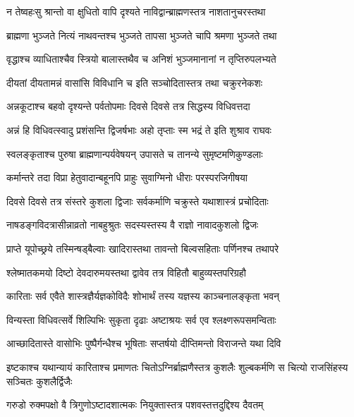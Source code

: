 \twolineshloka
{न तेष्वहःसु श्रान्तो वा क्षुधितो वापि दृश्यते}
{नाविद्वान्ब्राह्मणस्तत्र नाशतानुचरस्तथा} %

\twolineshloka
{ब्राह्मणा भुञ्जते नित्यं नाथवन्तश्च भुञ्जते}
{तापसा भुञ्जते चापि श्रमणा भुञ्जते तथा} %

\twolineshloka
{वृद्धाश्च व्याधिताश्चैव स्त्रियो बालास्तथैव च}
{अनिशं भुञ्जमानानां न तृप्तिरुपलभ्यते} %

\twolineshloka
{दीयतां दीयतामन्नं वासांसि विविधानि च}
{इति सञ्चोदितास्तत्र तथा चक्रुरनेकशः} %

\twolineshloka
{अन्नकूटाश्च बहवो दृश्यन्ते पर्वतोपमाः}
{दिवसे दिवसे तत्र सिद्धस्य विधिवत्तदा} %

\twolineshloka
{अन्नं हि विधिवत्स्वादु प्रशंसन्ति द्विजर्षभाः}
{अहो तृप्ताः स्म भद्रं ते इति शुश्राव राघवः} %

\twolineshloka
{स्वलङ्कृताश्च पुरुषा ब्राह्मणान्पर्यवेषयन्}
{उपासते च तानन्ये सुमृष्टमणिकुण्डलाः} %

\twolineshloka
{कर्मान्तरे तदा विप्रा हेतुवादान्बहूनपि}
{प्राहुः सुवाग्मिनो धीराः परस्परजिगीषया} %

\twolineshloka
{दिवसे दिवसे तत्र संस्तरे कुशला द्विजाः}
{सर्वकर्माणि चक्रुस्ते यथाशास्त्रं प्रचोदिताः} %

\twolineshloka
{नाषडङ्गविदत्रासीन्नाव्रतो नाबहुश्रुतः}
{सदस्यस्तस्य वै राज्ञो नावादकुशलो द्विजः} %

\twolineshloka
{प्राप्ते यूपोच्छ्रये तस्मिन्षड्बैल्वाः खादिरास्तथा}
{तावन्तो बिल्वसहिताः पर्णिनश्च तथापरे} %

\twolineshloka
{श्लेष्मातकमयो दिष्टो देवदारुमयस्तथा}
{द्वावेव तत्र विहितौ बाहुव्यस्तपरिग्रहौ} %

\twolineshloka
{कारिताः सर्व एवैते शास्त्रज्ञैर्यज्ञकोविदैः}
{शोभार्थं तस्य यज्ञस्य काञ्चनालङ्कृता भवन्} %

\twolineshloka
{विन्यस्ता विधिवत्सर्वे शिल्पिभिः सुकृता दृढाः}
{अष्टाश्रयः सर्व एव श्लक्ष्णरूपसमन्विताः} %

\twolineshloka
{आच्छादितास्ते वासोभिः पुष्पैर्गन्धैश्च भूषिताः}
{सप्तर्षयो दीप्तिमन्तो विराजन्ते यथा दिवि} %

\threelineshloka
{इष्टकाश्च यथान्यायं कारिताश्च प्रमाणतः}
{चितोऽग्निर्ब्राह्मणैस्तत्र कुशलैः शुल्बकर्मणि}
{स चित्यो राजसिंहस्य सञ्चितः कुशलैर्द्विजैः} %

\twolineshloka
{गरुडो रुक्मपक्षो वै त्रिगुणोऽष्टादशात्मकः}
{नियुक्तास्तत्र पशवस्तत्तदुद्दिश्य दैवतम्} %

